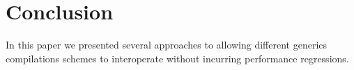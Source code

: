 \section{Conclusion}

In this paper we presented several approaches to allowing different generics compilations schemes to interoperate without incurring performance regressions.